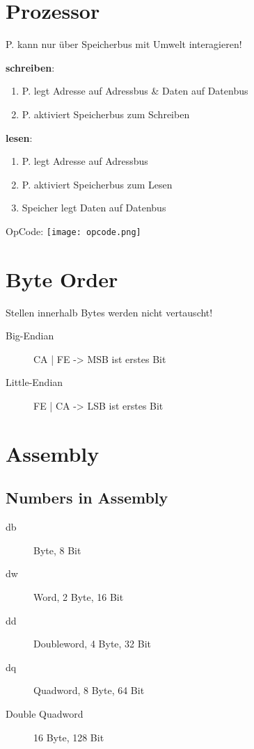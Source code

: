 

\newcommand{\TITLE}{Betriebssysteme 1}
\newcommand{\AUTHOR}{Mona Panchaud}
\newcommand{\INSTITUTE}{Ostschweizer Fachhochschule}

\begin{multicols*}{4}

\section{Prozessor}
P. kann nur über Speicherbus mit Umwelt interagieren!

\textbf{schreiben}:
\begin{enumerate}
    \item P. legt Adresse auf Adressbus \& Daten auf Datenbus
    \item P. aktiviert Speicherbus zum Schreiben
\end{enumerate}
\textbf{lesen}:
\begin{enumerate}
    \item P. legt Adresse auf Adressbus
    \item P. aktiviert Speicherbus zum Lesen
    \item Speicher legt Daten auf Datenbus
\end{enumerate}
OpCode: \texttt{[image: opcode.png]}

\section{Byte Order}
Stellen innerhalb Bytes werden nicht vertauscht!
\begin{description}
    \item[Big-Endian] CA | FE -> MSB ist erstes Bit
    \item[Little-Endian] FE | CA -> LSB ist erstes Bit
\end{description}

\section{Assembly}
\subsection{Numbers in Assembly}
\begin{description}
    \item[db] Byte, 8 Bit
    \item[dw] Word, 2 Byte, 16 Bit
    \item[dd] Doubleword, 4 Byte, 32 Bit
    \item[dq] Quadword, 8 Byte, 64 Bit
    \item [Double Quadword] 16 Byte, 128 Bit
\end{description}


\end{multicols*}
